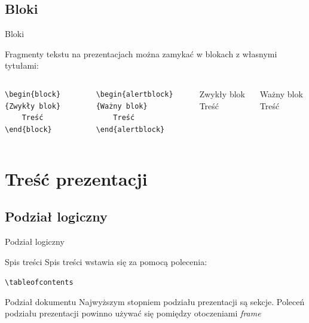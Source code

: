 \documentclass{beamer}
\begin{document}
	\subsection{Bloki}
	\begin{frame}[fragile]{Bloki}
		
	Fragmenty tekstu na prezentacjach można zamykać w blokach z własnymi tytułami:

	\begin{columns}
		
		\begin{lstlisting}
\begin{block}{Zwykły blok}
	Treść
\end{block}
		\end{lstlisting}
		
		\begin{lstlisting}
\begin{alertblock}{Ważny blok}
	Treść
\end{alertblock}
		\end{lstlisting}
		

	\begin{block}{Zwykły blok}
	Treść
	\end{block}
	\vspace{5mm}
	\begin{alertblock}{Ważny blok}
	Treść
	\end{alertblock}

	\end{columns}
	\end{frame}

\section{Treść prezentacji}
\subsection{Podział logiczny}
\begin{frame}[fragile]{Podział logiczny}
	\begin{block}{Spis treści}
		Spis treści wstawia się za pomocą polecenia:
		\begin{center}
			\verb|\tableofcontents|
		\end{center}

	\end{block}
	\begin{block}{Podział dokumentu}
		Najwyższym stopniem podziału prezentacji są sekcje.
		Poleceń podziału prezentacji powinno używać się pomiędzy otoczeniami \emph{frame}
	\end{block}
\end{frame}
\end{document}

